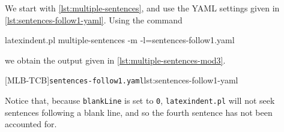  \begin{example}
 We start with \vref{lst:multiple-sentences}, and use the YAML settings given in
 \cref{lst:sentences-follow1-yaml}. Using the command 
  

 \begin{commandshell}
latexindent.pl multiple-sentences -m -l=sentences-follow1.yaml
\end{commandshell}

 we obtain the output given in \cref{lst:multiple-sentences-mod3}.

 \begin{cmhtcbraster}
  [MLB-TCB]{\texttt{sentences-follow1.yaml}}{lst:sentences-follow1-yaml}
 \end{cmhtcbraster}

 Notice that, because \texttt{blankLine} is set to \texttt{0}, \texttt{latexindent.pl}
 will not seek sentences following a blank line, and so the fourth sentence has not been
 accounted for.
 \end{example}

